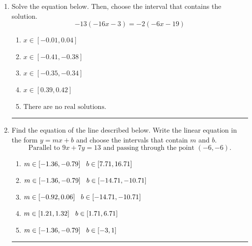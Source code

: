 \documentclass[14pt]{extbook}
\newcommand{\litem}[1]{\item#1\hspace*{-1cm}\rule{\textwidth}{0.4pt}}
\begin{document}
\begin{enumerate}
{\begin{enumerate}[label=\Alph*.]
\end{enumerate} }
\litem{
Solve the equation below. Then, choose the interval that contains the solution.\[ -13(-16x -3) = -2(-6x -19) \]\begin{enumerate}[label=\Alph*.]
\item \( x \in [-0.01, 0.04] \)
\item \( x \in [-0.41, -0.38] \)
\item \( x \in [-0.35, -0.34] \)
\item \( x \in [0.39, 0.42] \)
\item \( \text{There are no real solutions.} \)

\end{enumerate} }
\litem{
Find the equation of the line described below. Write the linear equation in the form $ y=mx+b $ and choose the intervals that contain $m$ and $b$.\[ \text{Parallel to } 9 x + 7 y = 13 \text{ and passing through the point } (-6, -6). \]\begin{enumerate}[label=\Alph*.]
\item \( m \in [-1.36, -0.79] \hspace*{3mm} b \in [7.71, 16.71] \)
\item \( m \in [-1.36, -0.79] \hspace*{3mm} b \in [-14.71, -10.71] \)
\item \( m \in [-0.92, 0.06] \hspace*{3mm} b \in [-14.71, -10.71] \)
\item \( m \in [1.21, 1.32] \hspace*{3mm} b \in [1.71, 6.71] \)
\item \( m \in [-1.36, -0.79] \hspace*{3mm} b \in [-3, 1] \)


\end{enumerate}}
\end{enumerate}
\end{document}
